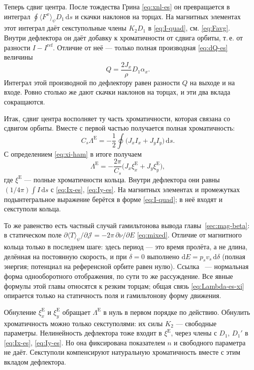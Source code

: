 Теперь сдвиг центра. После тождества Грина \eqref{eq:xnl-es} он превращается в интеграл $\oint\langle F^x\rangle_\psi D_1\,\mathrm{d}s$ и скачки наклонов на торцах. На магнитных элементах этот интеграл даёт секступольные члены $K_2D_1$ в \eqref{eq:I-quad}, см. \eqref{eq:Favg}. Внутри дефлектора он даёт добавку к хроматичности от сдвига орбиты, т.\,е. от разности $I-I^{\mathrm{ref}}$. Отличие от неё --- только полная производная \eqref{eq:dQ-es} величины
\begin{equation*}
Q=\frac{2J_x}{\rho}D_1\alpha_x.
\end{equation*}
Интеграл этой производной по дефлектору равен разности $Q$ на выходе и на входе. Ровно столько же дают скачки наклонов на торцах, и эти два вклада сокращаются.

Итак, сдвиг центра восполняет ту часть хроматичности, которая связана со сдвигом орбиты. Вместе с первой частью получается полная хроматичность:
\begin{equation*}
C_s\Lambda^{\mathrm{E}}=-\frac12\oint\bigl(J_xI_x+J_yI_y\bigr)\,\mathrm{d}s.
\end{equation*}
С определением \eqref{eq:xi-ham} в итоге получаем
\begin{equation}
\label{eq:Lambda-es-xi}
\Lambda^{\mathrm{E}}
=-\frac{2\pi}{C_s}\bigl(J_x\xi_x^{\mathrm{E}}+J_y\xi_y^{\mathrm{E}}\bigr),
\end{equation}
где $\xi^{\mathrm{E}}$ --- полные хроматичности кольца. Внутри дефлектора они равны $(1/4\pi)\int I\,\mathrm{d}s$ с \eqref{eq:Ix-es}, \eqref{eq:Iy-es}. На магнитных элементах и промежутках подынтегральное выражение берётся в форме \eqref{eq:I-quad}; в неё входят и секступоли кольца.

То же равенство есть частный случай гамильтонова вывода главы~\ref{sec:mag-beta}: в статическом поле $\partial\langle T\rangle_\psi/\partial\mathcal{J}=-2\pi\,\partial\nu/\partial E$ \eqref{eq:mixed}. Отличие от магнитного кольца только в последнем шаге: здесь период --- это время пролёта, а не длина, делённая на постоянную скорость, и при $\delta=0$ выполнено $\mathrm{d}E=p_sv_s\,\mathrm{d}\delta$ (полная энергия; потенциал на референсной орбите равен нулю). Ссылка~\cite{Berg2007} --- нормальная форма однооборотного отображения, по сути то же рассуждение. Все явные формулы этой главы относятся к резким торцам; общая связь \eqref{eq:Lambda-es-xi} опирается только на статичность поля и гамильтонову форму движения.

Обнуление $\xi_x^{\mathrm{E}}$ и $\xi_y^{\mathrm{E}}$ обращает $\Lambda^{\mathrm{E}}$ в нуль в первом порядке по действию. Обнулить хроматичность можно только секступолями: их силы $K_2$ --- свободные параметры. Нелинейность дефлектора тоже входит в $\xi^{\mathrm{E}}$, через члены с $D_1$, $D_1'$ в \eqref{eq:Ix-es}, \eqref{eq:Iy-es}. Но она фиксирована показателем $n$ и свободного параметра не даёт. Секступоли компенсируют натуральную хроматичность вместе с этим вкладом дефлектора.

